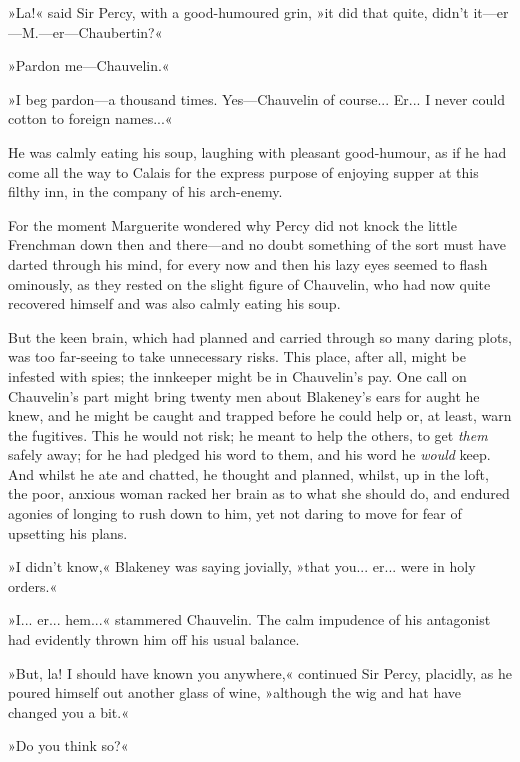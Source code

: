 »La!« said Sir Percy, with a good-humoured grin, »it did that quite, didn't it\allowbreak---\allowbreak er\allowbreak---\allowbreak M.\allowbreak---\allowbreak er\allowbreak---\allowbreak Chaubertin?«

»Pardon me\allowbreak---\allowbreak Chauvelin.«

»I beg pardon\allowbreak---\allowbreak a thousand times. Yes\allowbreak---\allowbreak Chauvelin of course... Er... I never could cotton to foreign names...«

He was calmly eating his soup, laughing with pleasant good-humour, as if he had come all the way to Calais for the express purpose of enjoying supper at this filthy inn, in the company of his arch-enemy.

For the moment Marguerite wondered why Percy did not knock the little Frenchman down then and there\allowbreak---\allowbreak and no doubt something of the sort must have darted through his mind, for every now and then his lazy eyes seemed to flash ominously, as they rested on the slight figure of Chauvelin, who had now quite recovered himself and was also calmly eating his soup.

But the keen brain, which had planned and carried through so many daring plots, was too far-seeing to take unnecessary risks. This place, after all, might be infested with spies; the innkeeper might be in Chauvelin's pay. One call on Chauvelin's part might bring twenty men about Blakeney's ears for aught he knew, and he might be caught and trapped before he could help or, at least, warn the fugitives. This he would not risk; he meant to help the others, to get \textit{them} safely away; for he had pledged his word to them, and his word he \textit{would} keep. And whilst he ate and chatted, he thought and planned, whilst, up in the loft, the poor, anxious woman racked her brain as to what she should do, and endured agonies of longing to rush down to him, yet not daring to move for fear of upsetting his plans.

»I didn't know,« Blakeney was saying jovially, »that you... er... were in holy orders.«

»I... er... hem...« stammered Chauvelin. The calm impudence of his antagonist had evidently thrown him off his usual balance.

»But, la! I should have known you anywhere,« continued Sir Percy, placidly, as he poured himself out another glass of wine, »although the wig and hat have changed you a bit.«

»Do you think so?«

